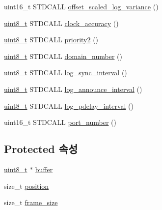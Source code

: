 \begin{DoxyCompactItemize}
\item 
uint16\+\_\+t S\+T\+D\+C\+A\+LL \hyperlink{classavdecc__lib_1_1avb__interface__descriptor__response__imp_a5e78785f19a6325e5d01e18908933fe5}{offset\+\_\+scaled\+\_\+log\+\_\+variance} ()
\item 
\hyperlink{stdint_8h_aba7bc1797add20fe3efdf37ced1182c5}{uint8\+\_\+t} S\+T\+D\+C\+A\+LL \hyperlink{classavdecc__lib_1_1avb__interface__descriptor__response__imp_a37cdf5d6dd1605fa24cf7343589302aa}{clock\+\_\+accuracy} ()
\item 
\hyperlink{stdint_8h_aba7bc1797add20fe3efdf37ced1182c5}{uint8\+\_\+t} S\+T\+D\+C\+A\+LL \hyperlink{classavdecc__lib_1_1avb__interface__descriptor__response__imp_a254c88e3bbdaf679bf13b9e6f9127445}{priority2} ()
\item 
\hyperlink{stdint_8h_aba7bc1797add20fe3efdf37ced1182c5}{uint8\+\_\+t} S\+T\+D\+C\+A\+LL \hyperlink{classavdecc__lib_1_1avb__interface__descriptor__response__imp_a30244d848a66656f4b93f46a9af091aa}{domain\+\_\+number} ()
\item 
\hyperlink{stdint_8h_aba7bc1797add20fe3efdf37ced1182c5}{uint8\+\_\+t} S\+T\+D\+C\+A\+LL \hyperlink{classavdecc__lib_1_1avb__interface__descriptor__response__imp_a35338397b1fc810ff7cba6f257751f49}{log\+\_\+sync\+\_\+interval} ()
\item 
\hyperlink{stdint_8h_aba7bc1797add20fe3efdf37ced1182c5}{uint8\+\_\+t} S\+T\+D\+C\+A\+LL \hyperlink{classavdecc__lib_1_1avb__interface__descriptor__response__imp_af01aef2f9428eafb3a9858a3a1dbbf0c}{log\+\_\+announce\+\_\+interval} ()
\item 
\hyperlink{stdint_8h_aba7bc1797add20fe3efdf37ced1182c5}{uint8\+\_\+t} S\+T\+D\+C\+A\+LL \hyperlink{classavdecc__lib_1_1avb__interface__descriptor__response__imp_ac6398edf03b1d1866f78bdcc3fb81a49}{log\+\_\+pdelay\+\_\+interval} ()
\item 
uint16\+\_\+t S\+T\+D\+C\+A\+LL \hyperlink{classavdecc__lib_1_1avb__interface__descriptor__response__imp_a9e3f1312965827592634c93659cfa444}{port\+\_\+number} ()
\end{DoxyCompactItemize}
\subsection*{Protected 속성}
\begin{DoxyCompactItemize}
\item 
\hyperlink{stdint_8h_aba7bc1797add20fe3efdf37ced1182c5}{uint8\+\_\+t} $\ast$ \hyperlink{classavdecc__lib_1_1descriptor__response__base__imp_a56ed84df35de10bdb65e72b184309497}{buffer}
\item 
size\+\_\+t \hyperlink{classavdecc__lib_1_1descriptor__response__base__imp_a7a04afe5347934be732ec70a70bd0a28}{position}
\item 
size\+\_\+t \hyperlink{classavdecc__lib_1_1descriptor__response__base__imp_affd041a595cabab98275245b9cb2824d}{frame\+\_\+size}
\end{DoxyCompactItemize}


